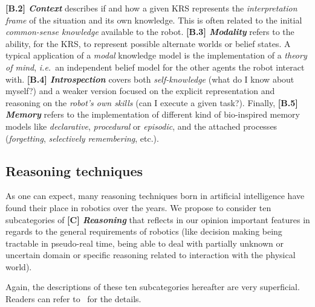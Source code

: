 \documentclass[journal]{IEEEtran}
\newcommand{\ie}{{\textit{i.e.\ }}}
\newcommand{\taxon}[2]{%
    \textbf{[#1] \emph{#2}}
}
\begin{document}
\taxon{B.2}{Context} describes if and how a given KRS represents the
\emph{interpretation frame} of the situation and its own knowledge. This is
often related to the initial \emph{common-sense knowledge} available to the
robot. \taxon{B.3}{Modality} refers to the ability, for the KRS, to represent
possible alternate worlds or belief states. A typical application of a
\emph{modal} knowledge model is the implementation of a \emph{theory of mind},
\ie an independent belief model for the other agents the robot interact with.
\taxon{B.4}{Introspection} covers both \emph{self-knowledge} (what do I know
about myself?) and a weaker version focused on the explicit representation and
reasoning on the \emph{robot's own skills} (can I execute a given task?).
Finally, \taxon{B.5}{Memory} refers to the implementation of
different kind of bio-inspired memory models like \emph{declarative},
\emph{procedural} or \emph{episodic}, and the attached processes
(\emph{forgetting}, \emph{selectively remembering}, etc.).

\subsection{Reasoning techniques}
\label{sect|reasoning}

As one can expect, many reasoning techniques born in artificial intelligence
have found their place in robotics over the years. We propose to consider ten
subcategories of \taxon{C}{Reasoning} that reflects in our opinion important
features in regards to the general requirements of robotics (like decision
making being tractable in pseudo-real time, being able to deal with partially
unknown or uncertain domain or specific reasoning related to interaction with
the physical world).

Again, the descriptions of these ten subcategories hereafter are very
superficial. Readers can refer to~\cite{lemaignan2012symbolic} for the details.
\end{document}
